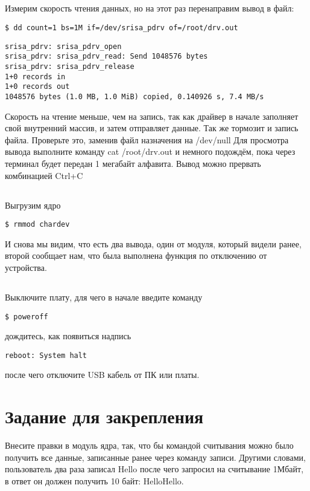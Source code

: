 \subsection{}Измерим скорость чтения данных, но на этот раз перенаправим вывод в файл: 
\begin{lstlisting}[style=bash]
$ dd count=1 bs=1M if=/dev/srisa_pdrv of=/root/drv.out
\end{lstlisting}
\begin{lstlisting}[style=stdout]
srisa_pdrv: srisa_pdrv_open 
srisa_pdrv: srisa_pdrv_read: Send 1048576 bytes 
srisa_pdrv: srisa_pdrv_release 
1+0 records in 
1+0 records out 
1048576 bytes (1.0 MB, 1.0 MiB) copied, 0.140926 s, 7.4 MB/s
\end{lstlisting}
Скорость на чтение меньше, чем на запись, так как драйвер в начале заполняет свой внутренний массив, и затем отправляет данные. Так же тормозит и запись файла. Проверьте это, заменив файл назначения на /dev/null Для просмотра вывода выполните команду cat /root/drv.out и немного подождём, пока через терминал будет передан 1 мегабайт алфавита. Вывод можно прервать комбинацией Ctrl+C

\subsection{}Выгрузим ядро 
\begin{lstlisting}[style=bash]
$ rmmod chardev
\end{lstlisting}
И снова мы видим, что есть два вывода, один от модуля, который видели ранее, второй сообщает нам, что была выполнена функция по отключению от устройства.  

\subsection{} Выключите плату, для чего в начале введите команду
\begin{lstlisting}[style=bash]
	$ poweroff
\end{lstlisting}
дождитесь, как появиться надпись
\begin{lstlisting}[style=stdout]
	reboot: System halt
\end{lstlisting}
после чего отключите USB кабель от ПК или платы.  

\section{Задание для закрепления}
Внесите правки в модуль ядра, так, что бы командой считывания можно было получить все данные, записанные ранее через команду записи. Другими словами, пользователь два раза записал Hello после чего запросил на считывание 1Мбайт, в ответ он должен получить 10 байт: HelloHello.

